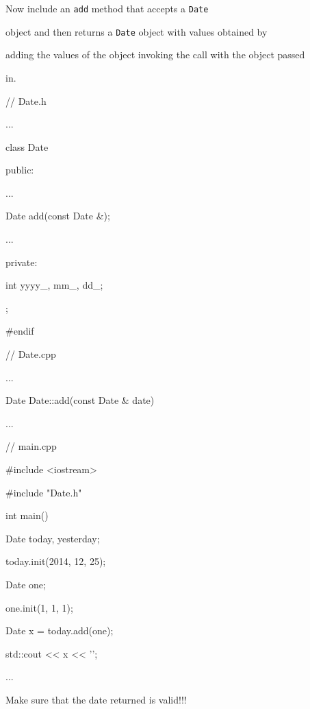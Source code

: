 Now include an \texttt{add} method that accepts a \texttt{Date}

object and then returns a \texttt{Date} object with values obtained by

adding the values of the object invoking the call with the object passed

in.



\begin{consolethree}[escapeinside=||]

// Date.h

...

class Date

{

public:

    ...

    Date add(const Date &);

    ...

private:

    int yyyy_, mm_, dd_;

};



#endif

\end{consolethree}



\begin{consolethree}[escapeinside=||]

// Date.cpp

...

Date Date::add(const Date & date)

{

}

...

\end{consolethree}



\begin{consolethree}[escapeinside=||]

// main.cpp

#include <iostream>

#include "Date.h"



int main()

{

    Date today, yesterday;

    today.init(2014, 12, 25);

    Date one;

    one.init(1, 1, 1);

    Date x = today.add(one);

    std::cout << x << '\n';

    ...

}

\end{consolethree}



Make sure that the date returned is valid!!!

